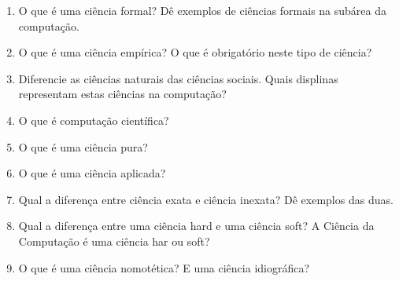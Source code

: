 \documentclass{article}
\begin{document}
\begin{enumerate}

\item O que é uma ciência formal? Dê exemplos de ciências formais na subárea da computação.
\item O que é uma ciência empírica? O que é obrigatório neste tipo de ciência?
\item Diferencie as ciências naturais das ciências sociais. Quais displinas representam estas ciências na computação?
\item O que é computação científica?
\item O que é uma ciência pura?
\item O que é uma ciência aplicada?
\item Qual a diferença entre ciência exata e ciência inexata? Dê exemplos das duas.
\item Qual a diferença entre uma ciência hard e uma ciência soft? A Ciência da Computação é uma ciência har ou soft?
\item O que é uma ciência nomotética? E uma ciência idiográfica?

\end{enumerate}


%
%
\end{document}
